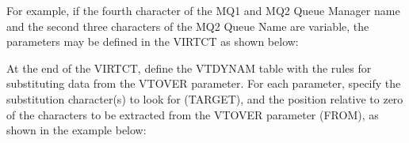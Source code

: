 \documentclass[letterpaper,10pt,english]{sphinxmanual}
\begin{document}
For example, if the fourth character of the MQ1 and MQ2 Queue Manager name and the second three characters of the MQ2 Queue Name are variable, the parameters may be defined in the VIRTCT as shown below:

\begin{sphinxVerbatim}[commandchars=\\\{\}]
               
        
         
\end{sphinxVerbatim}

At the end of the VIRTCT, define the VTDYNAM table with the rules for substituting data from the VTOVER parameter. For each parameter, specify the substitution character(s) to look for (TARGET), and the position relative to zero of the characters to be extracted from the VTOVER parameter (FROM), as shown in the example below:

\begin{sphinxVerbatim}[commandchars=\\\{\}]
                          
                                   
                                             
                                     
                       
     
     
\end{sphinxVerbatim}
\end{document}
